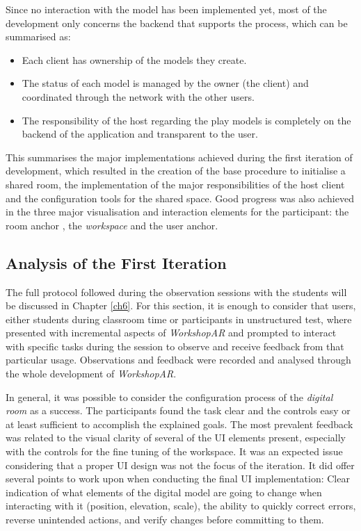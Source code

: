 Since no interaction with the model has been implemented yet, most of the development only concerns the backend that supports the process, which can be summarised as:

\begin{itemize}
    \item Each client has ownership of the models they create.
    \item The status of each model is managed by the owner (the client) and coordinated through the network with the other users.
    \item The responsibility of the host regarding the play models is completely on the backend of the application and transparent to the user.
\end{itemize}

This summarises the major implementations achieved during the first iteration of development, which resulted in the creation of the base procedure to initialise a shared
room, the implementation of the major responsibilities of the host client and the configuration tools for the shared space. Good progress was also achieved in the three
major visualisation and interaction elements for the participant: the room anchor , the \emph{workspace} and the user anchor.

\subsection{Analysis of the First Iteration \label{sec:5-2-2}}

The full protocol followed during the observation sessions with the students will be discussed in Chapter \ref{ch6}. For this section, it is enough to consider that users,
either students during classroom time or participants in unstructured test, where presented with incremental aspects of \emph{WorkshopAR} and prompted to interact with
specific tasks during the session to observe and receive feedback from that particular usage. Observations and feedback were recorded and analysed through the whole
development of \emph{WorkshopAR}.

In general, it was possible to consider the configuration process of the \emph{digital room} as a success. The participants found the task clear and the controls easy or at least
sufficient to accomplish the explained goals. The most prevalent feedback was related to the visual clarity of several of the UI elements present, especially with the
controls for the fine tuning of the workspace. It was an expected issue considering that a proper UI design was not the focus of the iteration. It did offer several points
to work upon when conducting the final UI implementation: Clear indication of what elements of the digital model are going to change when interacting with it (position,
elevation, scale), the ability to quickly correct errors, reverse unintended actions, and verify changes before committing to them.

